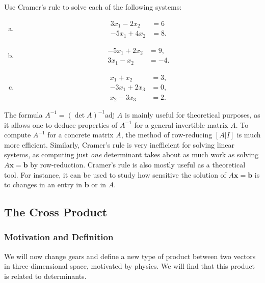 \documentclass[12pt,letterpaper,reqno]{article}
\numberwithin{equation}{section}
\begin{document}
\begin{exercise}
Use Cramer's rule to solve each of the following systems:
\begin{enumerate}[(a)]
	\item \begin{align*}
	3x_1-2x_2&=6 \\
	-5x_1+4x_2&=8.
	\end{align*}
	\item \begin{align*}
	-5x_1+2x_2&=9, \\
	3x_1-x_2&=-4.
\end{align*}
	\item \begin{align*}
	x_1+x_2&=3, \\
	-3x_1+2x_3&=0, \\
	x_2-3x_3&=2.
\end{align*}
\end{enumerate}
\end{exercise}
The formula $A^{-1}=(\det A)^{-1}\text{adj }A$ is mainly useful for theoretical purposes, as it allows one to deduce properties of $A^{-1}$ for a general invertible matrix $A$. To compute $A^{-1}$ for a concrete matrix $A$, the method of row-reducing $[A|I]$ is much more efficient. Similarly, Cramer's rule is very inefficient for solving linear systems, as computing just \emph{one} determinant takes about as much work as solving $A\mathbf{x}=\mathbf{b}$ by row-reduction. Cramer's rule is also mostly useful as a theoretical tool. For instance, it can be used to study how sensitive the solution of $A\mathbf{x}=\mathbf{b}$ is to changes in an entry in $\mathbf{b}$ or in $A$.

\subsection{The Cross Product}
\subsubsection{Motivation and Definition}
We will now change gears and define a new type of product between two vectors in three-dimensional space, motivated by physics. We will find that this product is related to determinants. 
\end{document}
